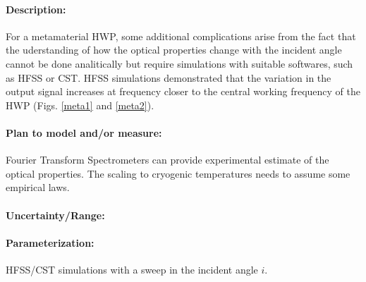 \paragraph{Description:}
For a metamaterial HWP, some additional complications arise from the fact that the uderstanding of how the optical properties change with the
incident angle cannot be done analitically but require simulations with suitable softwares, such as HFSS or CST.
HFSS simulations demonstrated that the variation in the output signal increases at frequency closer to the central working frequency of the
HWP (Figs. \ref{meta1} and \ref{meta2}).

\paragraph{Plan to model and/or measure:}
Fourier Transform Spectrometers can provide experimental estimate of the optical properties. The scaling to cryogenic temperatures 
needs to assume some empirical laws.

\paragraph{Uncertainty/Range:}


\paragraph{Parameterization:}
HFSS/CST simulations with a sweep in the incident angle $i$.



